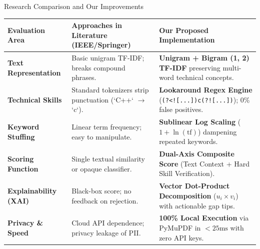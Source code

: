 \documentclass[aspectratio=169, 10pt]{beamer}
\begin{document}
\begin{frame}{Research Comparison and Our Improvements}
  \scriptsize
  \begin{table}[h]
    \centering
    \begin{tabular}{p{2.6cm} p{5.0cm} p{5.8cm}}
      \toprule
      \textbf{Evaluation Area} & \textbf{Approaches in Literature (IEEE/Springer)} & \textbf{Our Proposed Implementation} \\
      \midrule
      \textbf{Text Representation} & Basic unigram TF-IDF; breaks compound phrases. & \textbf{Unigram + Bigram (1, 2) TF-IDF} preserving multi-word technical concepts. \\
      \textbf{Technical Skills} & Standard tokenizers strip punctuation (`C++` $\rightarrow$ `c`). & \textbf{Lookaround Regex Engine} (\texttt{(?<![...])c(?![...])}); 0\% false positives. \\
      \textbf{Keyword Stuffing} & Linear term frequency; easy to manipulate. & \textbf{Sublinear Log Scaling} ($1 + \ln(\text{tf})$) dampening repeated keywords. \\
      \textbf{Scoring Function} & Single textual similarity or opaque classifier. & \textbf{Dual-Axis Composite Score} (Text Context + Hard Skill Verification). \\
      \textbf{Explainability (XAI)} & Black-box score; no feedback on rejection. & \textbf{Vector Dot-Product Decomposition} ($u_i \times v_i$) with actionable gap tips. \\
      \textbf{Privacy \& Speed} & Cloud API dependence; privacy leakage of PII. & \textbf{100\% Local Execution} via PyMuPDF in $<25\text{ms}$ with zero API keys. \\
      \bottomrule
    \end{tabular}
  \end{table}
\end{frame}
\end{document}

